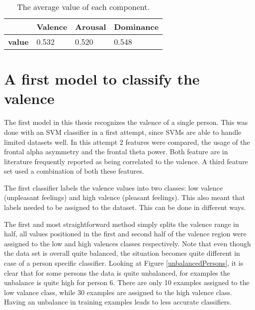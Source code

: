 \begin{table}[H]
\centering
\begin{tabular}{l|lll}
\textbf{}  & \textbf{Valence} & \textbf{Arousal} & \textbf{Dominance} \\ \hline
\textbf{value} & 0.532     	  & 0.520  			 & 0.548
\end{tabular}
\caption{The average value of each component.\label{avg-vals}}
\end{table}



\section{A first model to classify the valence}

The first model in this thesis recognizes the valence of a single person. This was done with an SVM classifier in a first attempt, since SVMs are able to handle limited datasets well. In this attempt 2 features were compared, the usage of the frontal alpha asymmetry and the frontal theta power. Both feature are in literature frequently reported as being correlated to the valence. A third feature set used a combination of both these features. 

\npar

The first classifier labels the valence values into two classes: low valence (unpleasant feelings) and high valence (pleasant feelings). This also meant that labels needed to be assigned to the dataset. This can be done in different ways. 

The first and most straightforward method simply splits the valence range in half, all values positioned in the first and second half of the valence region were assigned to the low and high valences classes respectively. Note that even though the data set is overall quite balanced, the situation becomes quite different in case of a person specific classifier. Looking at Figure \ref{unbalancedPersons}, it is clear that for some persons the data is quite unbalanced, for examples the unbalance is quite high for person 6. There are only 10 examples assigned to the low valance class, while 30 examples are assigned to the high valence class. Having an unbalance in training examples leads to less accurate classifiers.


